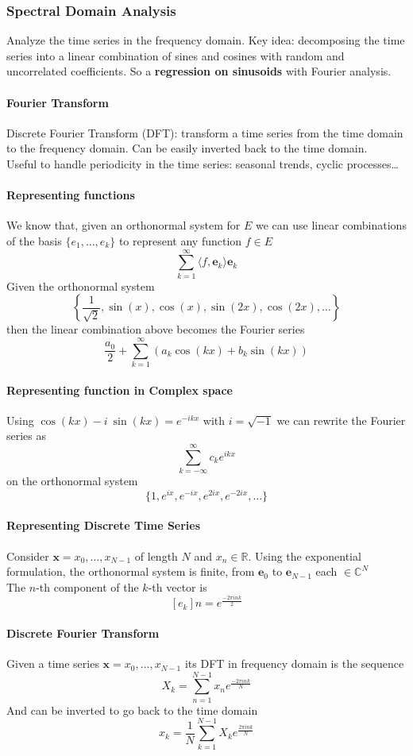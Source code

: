 \documentclass[10pt]{report}
\begin{document}
\subsubsection{Spectral Domain Analysis}
Analyze the time series in the frequency domain. Key idea: decomposing the time series into a linear combination of sines and cosines with random and uncorrelated coefficients. So a \textbf{regression on sinusoids} with Fourier analysis.
\paragraph{Fourier Transform} Discrete Fourier Transform (DFT): transform a time series from the time domain to the frequency domain. Can be easily inverted back to the time domain.\\
Useful to handle periodicity in the time series: seasonal trends, cyclic processes\ldots
\paragraph{Representing functions} We know that, given an orthonormal system for $E$ we can use linear combinations of the basis $\{e_1,\ldots,e_k\}$ to represent any function $f\in E$ $$\sum_{k=1}^\infty \langle f,\mathbf{e}_k\rangle \mathbf{e}_k$$
Given the orthonormal system $$\left\{\frac{1}{\sqrt{2}}, \sin(x),\cos(x),\sin(2x),\cos(2x),\ldots\right\}$$
then the linear combination above becomes the Fourier series 
$$\frac{a_0}{2}+\sum_{k=1}^\infty\left(a_k\cos(kx)+b_k\sin(kx)\right)$$
\paragraph{Representing function in Complex space} Using $\cos(kx)-i\:\sin(kx) = e^{-ikx}$ with $i=\sqrt{-1}$ we can rewrite the Fourier series as $$\sum_{k=-\infty}^\infty c_k e^{ikx}$$
on the orthonormal system $$\{1,e^{ix},e^{-ix},e^{2ix},e^{-2ix},\ldots\}$$
\paragraph{Representing Discrete Time Series} Consider $\mathbf{x}=x_0,\ldots,x_{N-1}$ of length $N$ and $x_n\in \mathbb{R}$. Using the exponential formulation, the orthonormal system is finite, from $\mathbf{e}_0$ to $\mathbf{e}_{N-1}$ each $\in \mathbb{C}^N$\\
The $n$-th component of the $k$-th vector is $$[e_k]n=e^{\frac{-2\pi ink}{2}}$$
\paragraph{Discrete Fourier Transform} Given a time series $\mathbf{x} = x_0,\ldots,x_{N-1}$ its DFT in frequency domain is the sequence $$X_k = \sum_{n=1}^{N-1}x_ne^{\frac{-2\pi ink}{N}}$$
And can be inverted to go back to the time domain $$x_k = \frac{1}{N}\sum_{k=1}^{N-1}X_ke^{\frac{2\pi ink}{N}}$$
\end{document}
